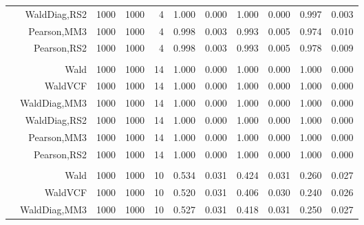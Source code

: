 \documentclass[
]{article}
\begin{document}
\begin{table}[H]
{\begin{tabular}[t]{lrrrrrrrlrr}
\hspace{1em} & WaldDiag,RS2 & 1000 & 1000 & 4 & 1.000 & 0.000 & 1.000 & 0.000 & 0.997 & 0.003\\

\hspace{1em} & Pearson,MM3 & 1000 & 1000 & 4 & 0.998 & 0.003 & 0.993 & 0.005 & 0.974 & 0.010\\

\hspace{1em} & Pearson,RS2 & 1000 & 1000 & 4 & 0.998 & 0.003 & 0.993 & 0.005 & 0.978 & 0.009\\
\cmidrule{1-11}
\addlinespace[0.3em]
\multicolumn{11}{l}{\textbf{1F 15V}}\\
\hspace{1em} & Wald & 1000 & 1000 & 14 & 1.000 & 0.000 & 1.000 & 0.000 & 1.000 & 0.000\\

\hspace{1em} & WaldVCF & 1000 & 1000 & 14 & 1.000 & 0.000 & 1.000 & 0.000 & 1.000 & 0.000\\

\hspace{1em} & WaldDiag,MM3 & 1000 & 1000 & 14 & 1.000 & 0.000 & 1.000 & 0.000 & 1.000 & 0.000\\

\hspace{1em} & WaldDiag,RS2 & 1000 & 1000 & 14 & 1.000 & 0.000 & 1.000 & 0.000 & 1.000 & 0.000\\

\hspace{1em} & Pearson,MM3 & 1000 & 1000 & 14 & 1.000 & 0.000 & 1.000 & 0.000 & 1.000 & 0.000\\

\hspace{1em} & Pearson,RS2 & 1000 & 1000 & 14 & 1.000 & 0.000 & 1.000 & 0.000 & 1.000 & 0.000\\
\cmidrule{1-11}
\addlinespace[0.3em]
\multicolumn{11}{l}{\textbf{2F 10V}}\\
\hspace{1em} & Wald & 1000 & 1000 & 10 & 0.534 & 0.031 & 0.424 & 0.031 & 0.260 & 0.027\\

\hspace{1em} & WaldVCF & 1000 & 1000 & 10 & 0.520 & 0.031 & 0.406 & 0.030 & 0.240 & 0.026\\

\hspace{1em} & WaldDiag,MM3 & 1000 & 1000 & 10 & 0.527 & 0.031 & 0.418 & 0.031 & 0.250 & 0.027\\


\end{tabular}}
\end{table}
\end{document}
